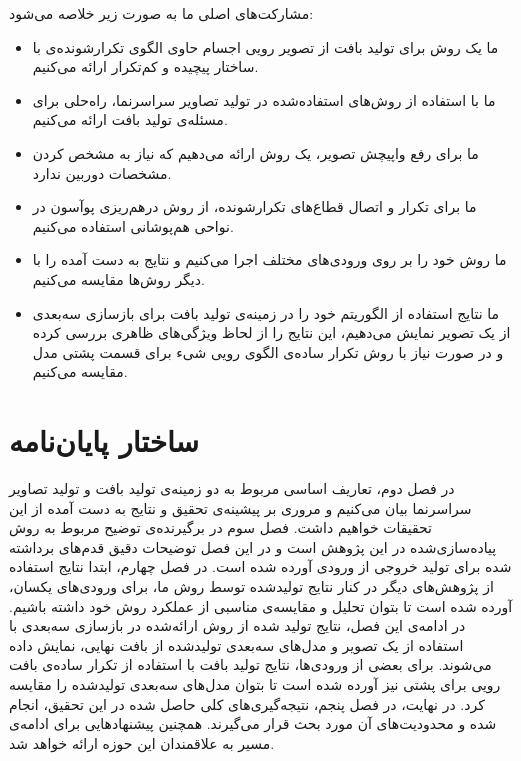 مشارکت‌های اصلی ما به صورت زیر خلاصه ‌می‌شود:
\begin{itemize}
	\item 
	ما یک روش برای تولید بافت از تصویر رویی اجسام حاوی الگوی تکرارشونده‌ی با ساختار پیچیده و کم‌تکرار ارائه می‌کنیم.
	\item 
	ما با استفاده از روش‌های استفاده‌شده در تولید تصاویر سراسرنما، راه‌حلی برای مسئله‌ی تولید بافت ارائه می‌کنیم.
	\item
	ما برای رفع واپیچش تصویر، یک روش ارائه می‌دهیم که نیاز به مشخص کردن مشخصات دوربین ندارد.
	\item 
	ما برای تکرار و اتصال قطاع‌های تکرارشونده، از روش در‌هم‌ریزی پوآسون در نواحی هم‌پوشانی استفاده می‌کنیم.
	\item 
	ما روش خود را بر روی ورودی‌های مختلف اجرا می‌کنیم و نتایج به دست آمده را با دیگر روش‌ها مقایسه می‌کنیم.
	\item
	ما نتایج استفاده از  الگوریتم خود را در زمینه‌ی تولید بافت برای بازسازی سه‌بعدی از یک تصویر نمایش می‌دهیم، این نتایج را از لحاظ ویژگی‌های ظاهری بررسی کرده و در صورت نیاز با روش تکرار ساده‌ی الگوی رویی شیء برای قسمت پشتی مدل مقایسه می‌کنیم.
\end{itemize}
\section{ساختار پایان‌نامه}
در فصل دوم، تعاریف اساسی مربوط به دو زمینه‌ی تولید بافت و تولید تصاویر سراسر‌نما بیان می‌کنیم و مروری بر پیشینه‌ی تحقیق و نتایج به دست آمده از این تحقیقات خواهیم داشت. فصل سوم در برگيرنده‌ی توضیح مربوط به روش پیاده‌سازی‌شده در این پژوهش است و در این فصل توضیحات دقیق قدم‌های برداشته شده برای تولید خروجی از ورودی آورده شده است.
در فصل چهارم، ابتدا نتایج استفاده از پژوهش‌های دیگر در کنار نتایج تولید‌شده توسط روش ما، برای ورودی‌های یکسان، آورده شده است تا بتوان تحلیل و مقایسه‌ی مناسبی از عملکرد روش خود داشته باشیم. در ادامه‌ی این فصل، نتایج تولید شده از روش ارائه‌شده در بازسازی سه‌بعدی با استفاده از یک تصویر و مدل‌های سه‌بعدی تولید‌شده از بافت ‌نهایی، نمایش داده می‌شوند. برای بعضی از ورودی‌ها، نتایج تولید بافت با استفاده از تکرار ساده‌ی بافت رویی برای پشتی نیز آورده شده است تا بتوان مدل‌های سه‌بعدی تولید‌شده را مقایسه کرد.
در نهايت، در فصل پنجم، نتيجه‌گيری‌های کلی حاصل شده در اين تحقيق، انجام شده و محدوديت‌های آن مورد بحث قرار می‌گیرند. همچنین پيشنهادهایی برای ادامه‌ی مسير به علاقمندان اين حوزه‌ ارائه خواهد شد. 